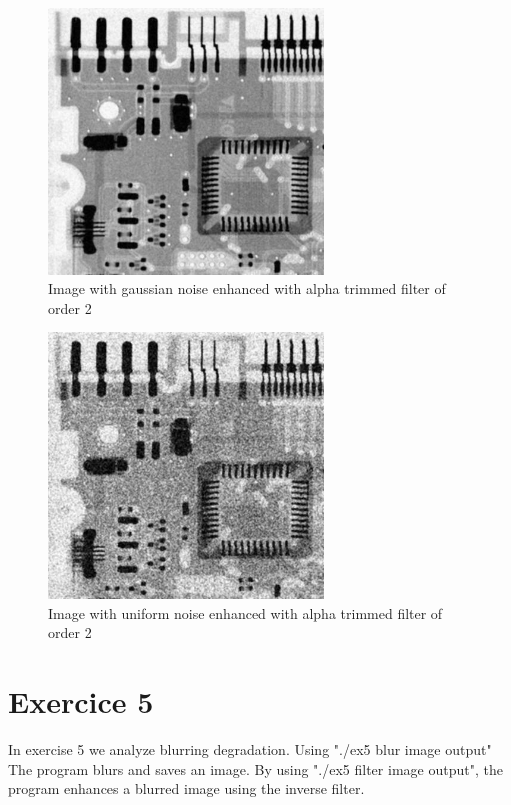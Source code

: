 \documentclass[10pt]{article}
\begin{document}
\begin{figure}[!ht]
	\centering
	\includegraphics[height=200pt]{./ex4/gaussalpha2.jpg}
	\caption{Image with gaussian noise enhanced with alpha trimmed filter of order 2}
\end{figure}
\begin{figure}[!ht]
	\centering
	\includegraphics[height=200pt]{./ex4/unialpha2.jpg}
	\caption{Image with uniform noise enhanced with alpha trimmed filter of order 2}
\end{figure}


\clearpage
\section{Exercice 5}
In exercise 5 we analyze blurring degradation.
Using "./ex5 blur image output" The program blurs and saves an image.
By using "./ex5 filter image output", the program enhances a blurred image using the inverse filter.
\end{document}

